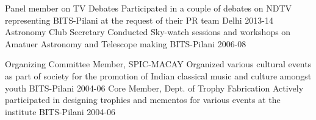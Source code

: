 

\begin{cvhonors}

  \cvhonor
    {Panel member on TV Debates} %
    {Participated in a couple of debates on NDTV representing BITS-Pilani at the request of their PR team} %
    {Delhi} %
    {2013-14} %
  \cvhonor
    {Astronomy Club Secretary} %
    {Conducted Sky-watch sessions and workshops on Amatuer Astronomy and Telescope making} %
    {BITS-Pilani} %
    {2006-08} %

  \cvhonor
    {Organizing Committee Member, SPIC-MACAY} %
    {Organized various cultural events as part of society for the promotion of Indian classical music and culture amongst youth} %
    {BITS-Pilani} %
    {2004-06} %
  \cvhonor
    {Core Member, Dept. of Trophy Fabrication} %
    {Actively participated in  designing trophies and mementos for various events at the institute} %
    {BITS-Pilani} %
    {2004-06} %
\end{cvhonors}
